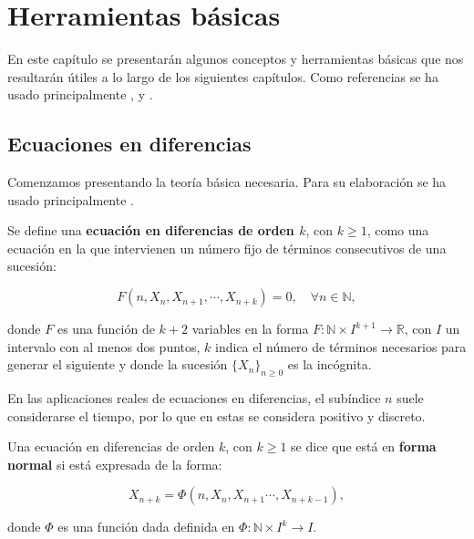
\chapter{Herramientas básicas}

En este capítulo se presentarán algunos conceptos y herramientas básicas que nos resultarán útiles a lo largo de los siguientes capítulos. Como referencias se ha usado principalmente \cite{brauerMathematicalModelsPopulation2012}, \cite{salinelliDiscreteDynamicalModels2014} y \cite{strogatzNonlinearDynamicsChaos1994}.

\section{Ecuaciones en diferencias}

Comenzamos presentando la teoría básica necesaria. Para su elaboración se ha usado principalmente \cite{salinelliDiscreteDynamicalModels2014}.

\begin{definition}
Se define una \textbf{ecuación en diferencias de orden $k$}, con $k\geq 1$, como una ecuación en la que intervienen un número fijo de términos consecutivos de una sucesión:

\begin{equation}
\label{def_ec_diferencias}
F(n,X_n, X_{n+1}, \cdots , X_{n+k}) = 0, \quad \forall n\in\mathbb{N},
\end{equation}


donde $F$ es una función de $k+2$ variables en la forma $F:\mathbb{N}\times I^{k+1}\rightarrow \mathbb{R}$, con $I$ un intervalo con al menos dos puntos, $k$ indica el número de términos necesarios para generar el siguiente y donde la sucesión $\{X_n\}_{n\geq 0}$ es la incógnita.
\end{definition}

En las aplicaciones reales de ecuaciones en diferencias, el subíndice $n$ suele considerarse el tiempo, por lo que en estas se considera positivo y discreto.

\begin{definition}
Una ecuación en diferencias de orden $k$, con $k\geq 1$ se dice que está en \textbf{forma normal} si está expresada de la forma:

\begin{equation}
\label{def_ec_forma_normal}
X_{n+k} = \Phi (n, X_n, X_{n+1}\cdots , X_{n+k-1}),
\end{equation}


donde $\Phi$ es una función dada definida en $\Phi :\mathbb{N}\times I^{k}\rightarrow I$.
\end{definition}

